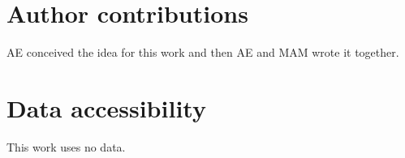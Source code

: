 



\begin{frame}
\frametitle{}

\end{frame}



\begin{frame}
\frametitle{}

\end{frame}



\begin{frame}
\frametitle{}

\end{frame}




\section*{Author contributions} AE conceived the idea for this work
and then AE and MAM wrote it together.

\section*{Data accessibility}

This work uses no data.



\clearpage

\thispagestyle{empty}






